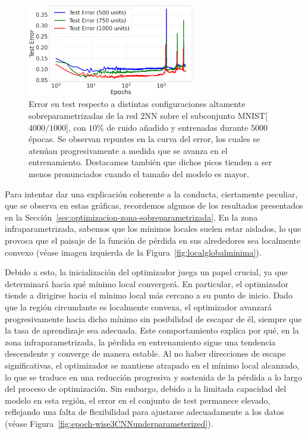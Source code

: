 \begin{figure}[h!]
    \centering
    \includegraphics[width=0.65\textwidth]{img/experiments/epoch-wiseMNIST.png}
    \caption[Error en test respecto a distintas configuraciones altamente sobreparametrizadas de la red $2$NN.]{Error en test respecto a distintas configuraciones altamente sobreparametrizadas de la red $2$NN sobre el subconjunto MNIST[$4000/1000$], con $10$\% de ruido añadido y entrenadas durante $5000$ épocas. Se observan repuntes en la curva del error, los cuales se atenúan progresivamente a medida que se avanza en el entrenamiento. Destacamos también que dichos picos tienden a ser menos pronunciados cuando el tamaño del modelo es mayor.}\label{fig:epoch-wiseMNIST}
\end{figure}

Para intentar dar una explicación coherente a la conducta, ciertamente peculiar, que se observa en estas gráficas, recordemos algunos de los resultados presentados en la Sección~\ref{sec:optimizacion-zona-sobreparametrizada}. En la zona infraparametrizada, sabemos que los mínimos locales suelen estar aislados, lo que provoca que el paisaje de la función de pérdida en sus alrededores sea localmente convexo (véase imagen izquierda de la Figura~\ref{fig:localglobalminima}).

Debido a esto, la inicialización del optimizador juega un papel crucial, ya que determinará hacia qué mínimo local convergerá. En particular, el optimizador tiende a dirigirse hacia el mínimo local más cercano a su punto de inicio. Dado que la región circundante es localmente convexa, el optimizador avanzará progresivamente hacia dicho mínimo sin posibilidad de escapar de él, siempre que la tasa de aprendizaje sea adecuada. Este comportamiento explica por qué, en la zona infraparametrizada, la pérdida en entrenamiento sigue una tendencia descendente y converge de manera estable. Al no haber direcciones de escape significativas, el optimizador se mantiene atrapado en el mínimo local alcanzado, lo que se traduce en una reducción progresiva y sostenida de la pérdida a lo largo del proceso de optimización. Sin embargo, debido a la limitada capacidad del modelo en esta región, el error en el conjunto de test permanece elevado, reflejando una falta de flexibilidad para ajustarse adecuadamente a los datos (véase Figura~\ref{fig:epoch-wise3CNNunderparameterized}).

